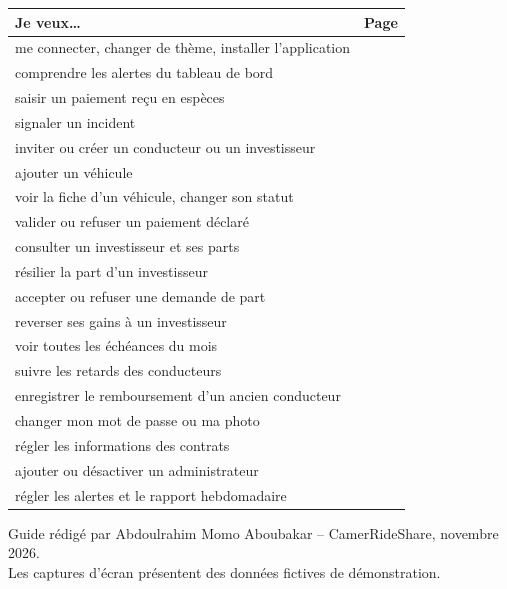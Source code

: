 \documentclass[11pt,a4paper]{article}
\begin{document}
\begin{center}
\begin{tabularx}{\linewidth}{@{}Xr@{}}
\toprule
\textbf{Je veux\ldots} & \textbf{Page}\\
\midrule
me connecter, changer de thème, installer l'application & \pageref{fig:connexion}\\
comprendre les alertes du tableau de bord & \pageref{fig:dashboard}\\
saisir un paiement reçu en espèces & \pageref{fig:saisirpaiement}\\
signaler un incident & \pageref{fig:signaler}\\
inviter ou créer un conducteur ou un investisseur & \pageref{fig:invitation}\\
ajouter un véhicule & \pageref{fig:ajoutvehicule}\\
voir la fiche d'un véhicule, changer son statut & \pageref{fig:detaila}\\
valider ou refuser un paiement déclaré & \pageref{fig:preuve}\\
consulter un investisseur et ses parts & \pageref{fig:profilinv}\\
résilier la part d'un investisseur & \pageref{fig:resilierpart}\\
accepter ou refuser une demande de part & \pageref{fig:demandes}\\
reverser ses gains à un investisseur & \pageref{fig:verser}\\
voir toutes les échéances du mois & \pageref{fig:calendrier}\\
suivre les retards des conducteurs & \pageref{fig:retardspage}\\
enregistrer le remboursement d'un ancien conducteur & \pageref{fig:remboursement}\\
changer mon mot de passe ou ma photo & \pageref{fig:profil}\\
régler les informations des contrats & \pageref{fig:plateforme}\\
ajouter ou désactiver un administrateur & \pageref{fig:acces}\\
régler les alertes et le rapport hebdomadaire & \pageref{fig:notifs}\\
\bottomrule
\end{tabularx}
\end{center}

\vfill
\begin{center}\small\color{gris}
Guide rédigé par Abdoulrahim Momo Aboubakar -- CamerRideShare, novembre 2026.\\
Les captures d'écran présentent des données fictives de démonstration.
\end{center}
\end{document}
